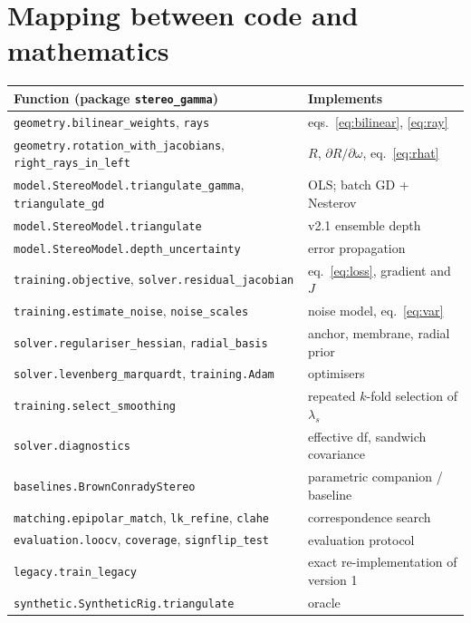 \documentclass[11pt,a4paper]{article}
\newcommand{\code}[1]{\texttt{#1}}
\begin{document}
\section{Mapping between code and mathematics}
\begin{center}\small
\begin{tabular}{ll}
\toprule
Function (package \texttt{stereo\_gamma}) & Implements\\
\midrule
\code{geometry.bilinear\_weights}, \code{rays} & eqs.~\eqref{eq:bilinear}, \eqref{eq:ray}\\
\code{geometry.rotation\_with\_jacobians}, \code{right\_rays\_in\_left} & $R$, $\partial R/\partial\omega$, eq.~\eqref{eq:rhat}\\
\code{model.StereoModel.triangulate\_gamma}, \code{triangulate\_gd} & OLS; batch GD + Nesterov\\
\code{model.StereoModel.triangulate} & v2.1 ensemble depth\\
\code{model.StereoModel.depth\_uncertainty} & error propagation\\
\code{training.objective}, \code{solver.residual\_jacobian} & eq.~\eqref{eq:loss}, gradient and $J$\\
\code{training.estimate\_noise}, \code{noise\_scales} & noise model, eq.~\eqref{eq:var}\\
\code{solver.regulariser\_hessian}, \code{radial\_basis} & anchor, membrane, radial prior\\
\code{solver.levenberg\_marquardt}, \code{training.Adam} & optimisers\\
\code{training.select\_smoothing} & repeated $k$-fold selection of $\lambda_s$\\
\code{solver.diagnostics} & effective df, sandwich covariance\\
\code{baselines.BrownConradyStereo} & parametric companion / baseline\\
\code{matching.epipolar\_match}, \code{lk\_refine}, \code{clahe} & correspondence search\\
\code{evaluation.loocv}, \code{coverage}, \code{signflip\_test} & evaluation protocol\\
\code{legacy.train\_legacy} & exact re-implementation of version 1\\
\code{synthetic.SyntheticRig.triangulate} & oracle\\
\bottomrule
\end{tabular}
\end{center}
\end{document}

